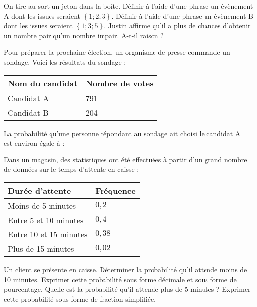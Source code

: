 \documentclass[../Cours.tex]{subfiles}
\begin{document}
\begin{questions}
    On tire au sort un jeton dans la boîte.
    \question Définir à l'aide d'une phrase un évènement A dont les issues seraient $\left\{ 1;2;3 \right\}$.
    \question Définir à l'aide d'une phrase un évènement B dont les issues seraient $\left\{ 1;3;5 \right\}$.
    \question Justin affirme qu'il a plus de chances d'obtenir un nombre pair qu'un nombre impair. A-t-il raison ?

    \exercice Pour préparer la prochaine élection, un organisme de presse commande un sondage. Voici les résultats du sondage :
    \begin{center}
        \begin{tabularx}{0.5\linewidth}{|X|X|}\hline
            Nom du candidat & Nombre de votes \\ \hline
            Candidat A & 791 \\ \hline
            Candidat B & 204 \\ \hline
        \end{tabularx}
    \end{center}
    \question La probabilité qu'une personne répondant au sondage ait choisi le candidat A \\est environ égale à :

    \exercice Dans un magasin, des statistiques ont été effectuées à partir d'un grand nombre de données sur le temps d'attente en caisse :
    \begin{center}
        \begin{tabularx}{0.5\linewidth}{|X|X|}\hline 
            Durée d'attente & Fréquence \\\hline
            Moins de 5 minutes & $0,2$ \\\hline 
            Entre 5 et 10 minutes & $0,4$ \\\hline
            Entre 10 et 15 minutes & $0,38$ \\\hline 
            Plus de 15 minutes & $0,02$ \\\hline
        \end{tabularx}
    \end{center}

    Un client se présente en caisse.
    \question Déterminer la probabilité qu'il attende moins de 10 minutes. Exprimer cette probabilité sous forme décimale et sous forme de pourcentage.
    \question Quelle est la probabilité qu'il attende plus de 5 minutes ? Exprimer cette probabilité sous forme de fraction simplifiée.


\end{questions}
\end{document}

